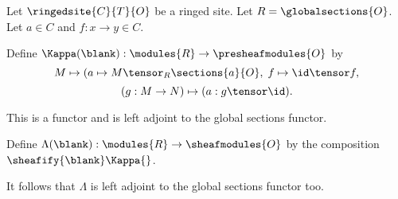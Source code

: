 Let $\ringedsite{C}{T}{O}$ be a ringed site.
Let $R=\globalsections{O}$. Let $a\in C$ and $f:x\rightarrow y \in C$.

Define $\Kappa(\blank): \modules{R} \rightarrow \presheafmodules{O}$ by
\[M \mapsto (a \mapsto M \tensor_R \sections{a}{O} ,\; f \mapsto \id \tensor f ,\]
\[(g: M \rightarrow N) \mapsto (a: g \tensor \id )  .\]

This is a functor and is left adjoint to the global sections functor.

Define $\Lambda(\blank):\modules{R} \rightarrow \sheafmodules{O}$ by the composition
$\sheafify{\blank} \Kappa{}$.

It follows that $\Lambda$ is left adjoint to the global sections functor too.